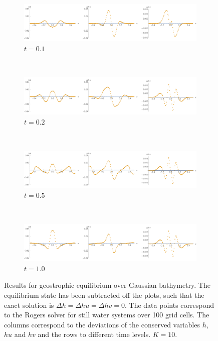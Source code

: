 \begin{figure}
  \centering
  \begin{subfigure}{\textwidth}
    \includegraphics[width=\textwidth]{diagrams/results-geo-gauss-1}
    \caption{$t = 0.1$}
    \label{fig:results-geo-gauss-1}
  \end{subfigure} \\
  \begin{subfigure}{\textwidth}
    \includegraphics[width=\textwidth]{diagrams/results-geo-gauss-2}
    \caption{$t = 0.2$}
    \label{fig:results-geo-gauss-2}
  \end{subfigure} \\
  \begin{subfigure}{\textwidth}
    \includegraphics[width=\textwidth]{diagrams/results-geo-gauss-5}
    \caption{$t = 0.5$}
    \label{fig:results-geo-gauss-5}
  \end{subfigure} \\
  \begin{subfigure}{\textwidth}
    \includegraphics[width=\textwidth]{diagrams/results-geo-gauss-10}
    \caption{$t = 1.0$}
    \label{fig:results-geo-gauss-10}
  \end{subfigure}
  \caption{Results for geostrophic equilibrium over Gaussian bathymetry. The equilibrium state has been subtracted off the plots, such that the exact solution is $\Delta h = \Delta hu = \Delta hv = 0$. The data points correspond to the Rogers solver for still water systems over 100 grid cells. The columns correspond to the deviations of the conserved variables $h$, $hu$ and $hv$ and the rows to different time levels. $K = 10$.}
  \label{fig:results-geo-gauss}
\end{figure}

